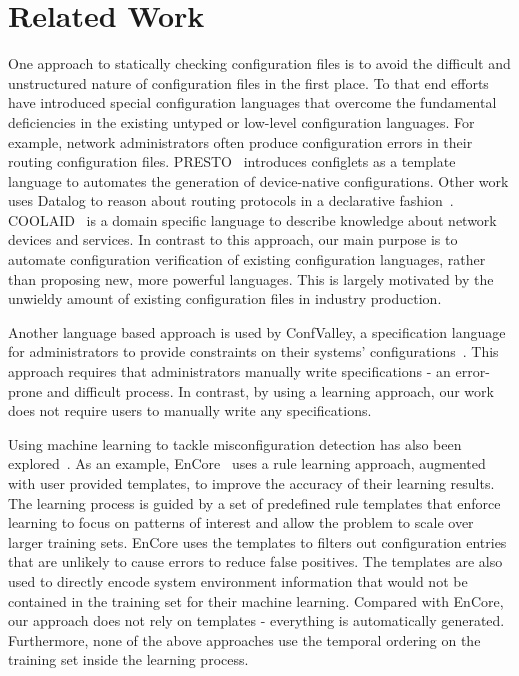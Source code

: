 
\section{Related Work}


One approach to statically checking configuration files is to avoid the difficult and unstructured nature of configuration files in the first place.
To that end efforts have introduced special configuration languages that overcome the fundamental deficiencies in the existing untyped or low-level configuration languages. 
For example, network administrators often produce configuration errors in their routing configuration files.
PRESTO~\cite{enck07configuration} introduces configlets as a template language to automates the generation of device-native configurations.
Other work uses Datalog to reason about routing protocols in a declarative fashion~\cite{loo05declarative}. 
COOLAID~\cite{chen10declarative} is a domain specific language to describe knowledge about network devices and services.
In contrast to this approach, our main purpose is to automate configuration verification of existing configuration languages, rather than proposing new, more powerful languages.
This is largely motivated by the unwieldy amount of existing configuration files in industry production.

Another language based approach is used by ConfValley, a specification language for administrators to provide constraints on their systems' configurations~\cite{huang15confvalley}. 
This approach requires that administrators manually write specifications - an error-prone and difficult process. 
In contrast, by using a learning approach, our work does not require users to manually write any specifications.

Using machine learning to tackle misconfiguration detection has also been explored~\cite{yuan11context, zhang14encore, xu16early}.
As an example, EnCore~\cite{zhang14encore} uses a rule learning approach, augmented with user provided templates, to improve the accuracy of their learning results.
The learning process is guided by a set of predefined rule templates that enforce learning to focus on patterns of interest and allow the problem to scale over larger training sets.
EnCore uses the templates to filters out configuration entries that are unlikely to cause errors to reduce false positives.
The templates are also used to directly encode system environment information that would not be contained in the training set for their machine learning.
Compared with EnCore, our approach does not rely on templates - everything is automatically generated.
Furthermore, none of the above approaches use the temporal ordering on the training set inside the learning process.

